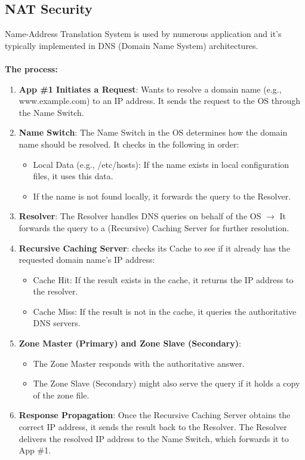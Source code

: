 \subsection{NAT Security}
Name-Address Translation System is used by numerous application and it's typically implemented in DNS (Domain Name System)
architectures.\\
\\
\textbf{The process:}
\begin{enumerate}
    \item \textbf{App \#1 Initiates a Request}: Wants to resolve a domain name (e.g., www.example.com)
    to an IP address. It sends the request to the OS through the Name Switch.
    \item \textbf{Name Switch}: The Name Switch in the OS determines how the domain name should be resolved. It checks in the following in order:
    \begin{itemize}
        \item Local Data (e.g., /etc/hosts): If the name exists in local configuration files, it uses
        this data.
        \item If the name is not found locally, it forwards the query to the Resolver.
    \end{itemize}
    \item \textbf{Resolver}: The Resolver handles DNS queries on behalf of the OS \(\rightarrow \) It forwards the query to a (Recursive) Caching Server for further resolution.
    \item \textbf{Recursive Caching Server}: checks its Cache to see if it already has the requested domain name’s IP address:
    \begin{itemize}
        \item Cache Hit: If the result exists in the cache, it returns the IP address to the resolver.
        \item Cache Miss: If the result is not in the cache, it queries the authoritative DNS servers.
    \end{itemize}
    \item \textbf{Zone Master (Primary) and Zone Slave (Secondary)}:
    \begin{itemize}
        \item The Zone Master responds with the authoritative answer.
        \item The Zone Slave (Secondary) might also serve the query if it holds a copy of the zone
        file.
    \end{itemize}
    \item \textbf{Response Propagation}: Once the Recursive Caching Server obtains the correct IP
    address, it sends the result back to the Resolver. The Resolver delivers the resolved IP address to the Name Switch, which forwards it to App \#1.
\end{enumerate}

